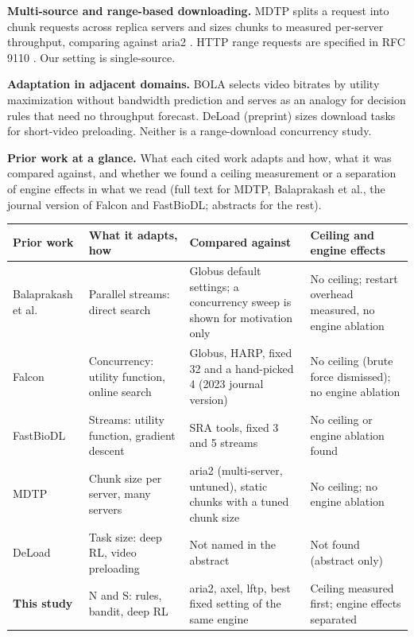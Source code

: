 \documentclass{ieeeaccess}
\begin{document}
\textbf{Multi-source and range-based downloading.} MDTP \cite{abdollah2025mdtp} splits a request into chunk requests across replica servers and sizes chunks to measured per-server throughput, comparing against aria2 \cite{aria2manual}. HTTP range requests are specified in RFC 9110 \cite{rfc9110}. Our setting is single-source.


\textbf{Adaptation in adjacent domains.} BOLA \cite{spiteri2016bola,spiteri2020bola} selects video bitrates by utility maximization without bandwidth prediction and serves as an analogy for decision rules that need no throughput forecast. DeLoad \cite{liu2025deload} (preprint) sizes download tasks for short-video preloading. Neither is a range-download concurrency study.


\textbf{Prior work at a glance.} What each cited work adapts and how, what it was compared against, and whether we found a ceiling measurement or a separation of engine effects in what we read (full text for MDTP, Balaprakash et al., the journal version of Falcon and FastBioDL; abstracts for the rest).


\begin{table}[!t]\centering\footnotesize
\begin{tabularx}{\textwidth}{@{}LLLL@{}}
\toprule
\textbf{Prior work} & \textbf{What it adapts, how} & \textbf{Compared against} & \textbf{Ceiling and engine effects}\\
\midrule
Balaprakash et al. \cite{balaprakash2016direct} & Parallel streams: direct search & Globus default settings; a concurrency sweep is shown for motivation only & No ceiling; restart overhead measured, no engine ablation\\
Falcon \cite{arifuzzaman2021online,arifuzzaman2023falcon} & Concurrency: utility function, online search & Globus, HARP, fixed 32 and a hand-picked 4 (2023 journal version) & No ceiling (brute force dismissed); no engine ablation\\
FastBioDL \cite{swargo2025fastbiodl} & Streams: utility function, gradient descent & SRA tools, fixed 3 and 5 streams & No ceiling or engine ablation found\\
MDTP \cite{abdollah2025mdtp} & Chunk size per server, many servers & aria2 (multi-server, untuned), static chunks with a tuned chunk size & No ceiling; no engine ablation\\
DeLoad \cite{liu2025deload} & Task size: deep RL, video preloading & Not named in the abstract & Not found (abstract only)\\
\textbf{This study} & N and S: rules, bandit, deep RL & aria2, axel, lftp, best fixed setting of the same engine & Ceiling measured first; engine effects separated\\
\bottomrule
\end{tabularx}
\end{table}
\end{document}
